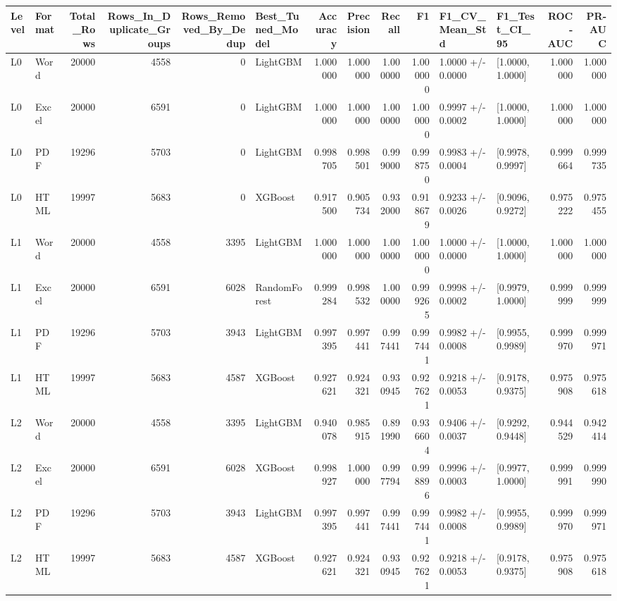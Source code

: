 \begin{tabular}{llrrrlrrrrllrr}
\toprule
Level & Format & Total_Rows & Rows_In_Duplicate_Groups & Rows_Removed_By_Dedup & Best_Tuned_Model & Accuracy & Precision & Recall & F1 & F1_CV_Mean_Std & F1_Test_CI_95 & ROC-AUC & PR-AUC \\
\midrule
L0 & Word & 20000 & 4558 & 0 & LightGBM & 1.000000 & 1.000000 & 1.000000 & 1.000000 & 1.0000 +/- 0.0000 & [1.0000, 1.0000] & 1.000000 & 1.000000 \\
L0 & Excel & 20000 & 6591 & 0 & LightGBM & 1.000000 & 1.000000 & 1.000000 & 1.000000 & 0.9997 +/- 0.0002 & [1.0000, 1.0000] & 1.000000 & 1.000000 \\
L0 & PDF & 19296 & 5703 & 0 & LightGBM & 0.998705 & 0.998501 & 0.999000 & 0.998750 & 0.9983 +/- 0.0004 & [0.9978, 0.9997] & 0.999664 & 0.999735 \\
L0 & HTML & 19997 & 5683 & 0 & XGBoost & 0.917500 & 0.905734 & 0.932000 & 0.918679 & 0.9233 +/- 0.0026 & [0.9096, 0.9272] & 0.975222 & 0.975455 \\
L1 & Word & 20000 & 4558 & 3395 & LightGBM & 1.000000 & 1.000000 & 1.000000 & 1.000000 & 1.0000 +/- 0.0000 & [1.0000, 1.0000] & 1.000000 & 1.000000 \\
L1 & Excel & 20000 & 6591 & 6028 & RandomForest & 0.999284 & 0.998532 & 1.000000 & 0.999265 & 0.9998 +/- 0.0002 & [0.9979, 1.0000] & 0.999999 & 0.999999 \\
L1 & PDF & 19296 & 5703 & 3943 & LightGBM & 0.997395 & 0.997441 & 0.997441 & 0.997441 & 0.9982 +/- 0.0008 & [0.9955, 0.9989] & 0.999970 & 0.999971 \\
L1 & HTML & 19997 & 5683 & 4587 & XGBoost & 0.927621 & 0.924321 & 0.930945 & 0.927621 & 0.9218 +/- 0.0053 & [0.9178, 0.9375] & 0.975908 & 0.975618 \\
L2 & Word & 20000 & 4558 & 3395 & LightGBM & 0.940078 & 0.985915 & 0.891990 & 0.936604 & 0.9406 +/- 0.0037 & [0.9292, 0.9448] & 0.944529 & 0.942414 \\
L2 & Excel & 20000 & 6591 & 6028 & XGBoost & 0.998927 & 1.000000 & 0.997794 & 0.998896 & 0.9996 +/- 0.0003 & [0.9977, 1.0000] & 0.999991 & 0.999990 \\
L2 & PDF & 19296 & 5703 & 3943 & LightGBM & 0.997395 & 0.997441 & 0.997441 & 0.997441 & 0.9982 +/- 0.0008 & [0.9955, 0.9989] & 0.999970 & 0.999971 \\
L2 & HTML & 19997 & 5683 & 4587 & XGBoost & 0.927621 & 0.924321 & 0.930945 & 0.927621 & 0.9218 +/- 0.0053 & [0.9178, 0.9375] & 0.975908 & 0.975618 \\
\bottomrule
\end{tabular}
